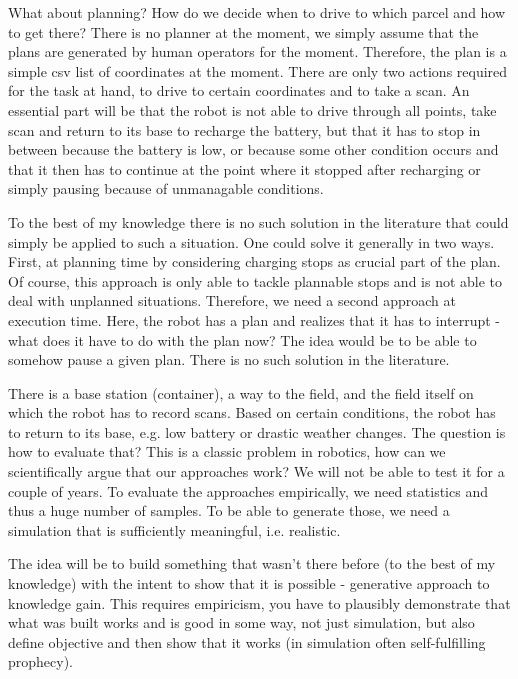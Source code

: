 \documentclass[german, master, expose, latin1]{base/thesis_KBS}
\begin{document}
What about planning? How do we decide when to drive to which parcel and how to get there? There is no planner at the moment, we simply assume that the plans
are generated by human operators for the moment. Therefore, the plan is a simple csv list of coordinates at the moment. There are only two actions required for
the task at hand, to drive to certain coordinates and to take a scan. An essential part will be that the robot is not able to drive through all points, take scan and
return to its base to recharge the battery, but that it has to stop in between because the battery is low, or because some other condition occurs
and that it then has to continue at the point where it stopped after recharging or simply pausing because of unmanagable conditions.\newline

To the best of my knowledge there is no such solution in the literature that could simply be applied to such a situation.
One could solve it generally in two ways. First, at planning time by considering charging stops as crucial part of the plan. Of course, this approach
is only able to tackle plannable stops and is not able to deal with unplanned situations. Therefore, we need a second approach at execution time.
Here, the robot has a plan and realizes that it has to interrupt - what does it have to do with the plan now? The idea would be to be able to somehow
pause a given plan. There is no such solution in the literature.\newline

There is a base station (container), a way to the field, and the field itself on which the robot has to record scans. Based on certain conditions, the robot has to return
to its base, e.g. low battery or drastic weather changes. The question is how to evaluate that?
This is a classic problem in robotics, how can we scientifically argue that our approaches work? We will not be able to test it for a couple of years.
To evaluate the approaches empirically, we need statistics and thus a huge number of samples. To be able to generate those, we need a simulation
that is sufficiently meaningful, i.e. realistic.\newline

The idea will be to build something that wasn't there before (to the best of my knowledge) with the intent to show that it is possible - generative approach to knowledge gain.
This requires empiricism, you have to plausibly demonstrate that what was built works and is good in some way, not just simulation, but also define objective and then 
show that it works (in simulation often self-fulfilling prophecy).\newline
\end{document}

